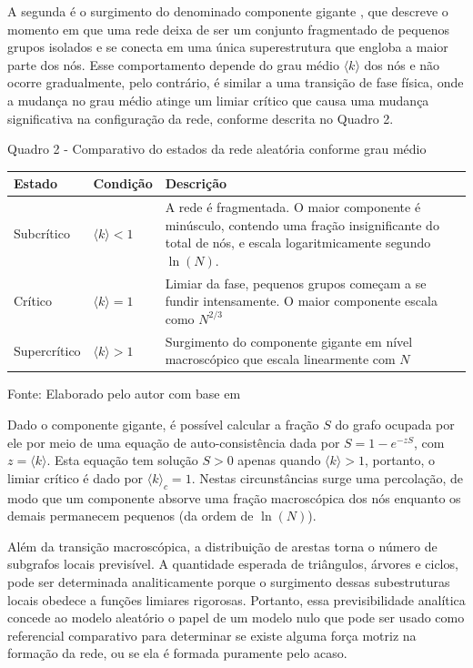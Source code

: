 \documentclass[12pt,oneside,a4paper,brazil,sumario=tradicional]{abntex2}
\begin{document}
A segunda é o surgimento do denominado componente gigante \cite{albert2002}, que descreve o momento em que uma rede deixa de ser um conjunto fragmentado de pequenos grupos isolados e se conecta em uma única superestrutura que engloba a maior parte dos nós. Esse comportamento depende do grau médio $\langle k \rangle$ dos nós e não ocorre gradualmente, pelo contrário, é similar a uma transição de fase física, onde a mudança no grau médio atinge um limiar crítico que causa uma mudança significativa na configuração da rede, conforme descrita no Quadro 2.

Quadro 2 - Comparativo do estados da rede aleatória conforme grau médio

\begin{center}
\begin{tabular}{p{4cm}|p{4cm}|p{4cm}}
\toprule
Estado & Condição & Descrição \\
\midrule
Subcrítico & $\langle k \rangle < 1$ & A rede é fragmentada. O maior componente é minúsculo, contendo uma fração insignificante do total de nós, e escala logaritmicamente segundo $\ln(N)$. \\
Crítico & $\langle k \rangle = 1$ & Limiar da fase, pequenos grupos começam a se fundir intensamente. O maior componente escala como $N^{2/3}$ \\
Supercrítico & $\langle k \rangle > 1$ & Surgimento do componente gigante em nível macroscópico que escala linearmente com $N$ \\
\bottomrule
\end{tabular}
\end{center}
Fonte: Elaborado pelo autor com base em 

Dado o componente gigante, é possível calcular a fração $S$ do grafo ocupada por ele por meio de uma equação de auto-consistência dada por $S = 1 - e^{-zS}$, com $z = \langle k \rangle$. Esta equação tem solução $S > 0$ apenas quando $\langle k \rangle > 1$, portanto, o limiar crítico é dado por $\langle k \rangle_{c} = 1$. Nestas circunstâncias surge uma percolação, de modo que um componente absorve uma fração macroscópica dos nós enquanto os demais permanecem pequenos (da ordem de $\ln(N)$).

Além da transição macroscópica, a distribuição de arestas torna o número de subgrafos locais previsível. A quantidade esperada de triângulos, árvores e ciclos, pode ser  determinada analiticamente porque o surgimento dessas subestruturas locais obedece a funções limiares rigorosas. Portanto, essa previsibilidade analítica concede ao modelo aleatório o papel de um modelo nulo que pode ser usado como referencial comparativo para determinar se existe alguma força motriz na formação da rede, ou se ela é formada puramente pelo acaso.
\end{document}
